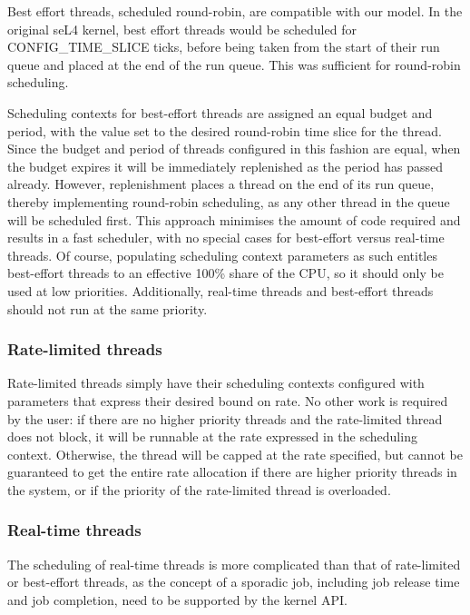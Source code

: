 Best effort threads, scheduled round-robin, are compatible with our model.
In the original seL4 kernel, best effort threads would be scheduled for CONFIG\_TIME\_SLICE ticks, before being taken from the start of their run queue and placed at the end of the run queue.
This was sufficient for round-robin scheduling.

Scheduling contexts for best-effort threads are assigned an equal budget and period, with the value set to the desired round-robin time slice for the thread.
Since the budget and period of threads configured in this fashion are equal, when the budget expires it will be immediately replenished as the period has passed already.
However, replenishment places a thread on the end of its run queue, thereby implementing round-robin scheduling, as any other thread in the queue will be scheduled first.
This approach minimises the amount of code required and results in a fast scheduler, with no special cases for best-effort versus real-time threads.
Of course, populating scheduling context parameters as such entitles best-effort threads to an effective 100\% share of the CPU, so it should only be used at low priorities.
Additionally, real-time threads and best-effort threads should not run at the same priority.

\subsubsection{Rate-limited threads}

Rate-limited threads simply have their scheduling contexts configured with parameters that express their desired bound on rate.
No other work is required by the user: if there are no higher priority threads and the rate-limited thread does not block, it will be runnable at the rate expressed in the scheduling context.
Otherwise, the thread will be capped at the rate specified, but cannot be guaranteed to get the entire rate allocation if there are higher priority threads in the system, or if the priority of the rate-limited thread is overloaded.

\subsubsection{Real-time threads}

The scheduling of real-time threads is more complicated than that of rate-limited or best-effort threads, as the concept of a sporadic job, including job release time and job completion, need to be supported by the kernel API.

